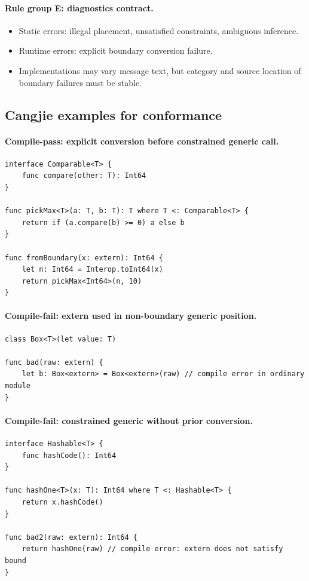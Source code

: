\documentclass[11pt,a4paper]{article}
\begin{document}
\paragraph{Rule group E: diagnostics contract.}
\begin{itemize}
  \item Static errors: illegal placement, unsatisfied constraints, ambiguous inference.
  \item Runtime errors: explicit boundary conversion failure.
  \item Implementations may vary message text, but category and source location of boundary failures must be stable.
\end{itemize}

\subsection{Cangjie examples for conformance}

\paragraph{Compile-pass: explicit conversion before constrained generic call.}
\begin{verbatim}
interface Comparable<T> {
    func compare(other: T): Int64
}

func pickMax<T>(a: T, b: T): T where T <: Comparable<T> {
    return if (a.compare(b) >= 0) a else b
}

func fromBoundary(x: extern): Int64 {
    let n: Int64 = Interop.toInt64(x)
    return pickMax<Int64>(n, 10)
}
\end{verbatim}

\paragraph{Compile-fail: extern used in non-boundary generic position.}
\begin{verbatim}
class Box<T>(let value: T)

func bad(raw: extern) {
    let b: Box<extern> = Box<extern>(raw) // compile error in ordinary module
}
\end{verbatim}

\paragraph{Compile-fail: constrained generic without prior conversion.}
\begin{verbatim}
interface Hashable<T> {
    func hashCode(): Int64
}

func hashOne<T>(x: T): Int64 where T <: Hashable<T> {
    return x.hashCode()
}

func bad2(raw: extern): Int64 {
    return hashOne(raw) // compile error: extern does not satisfy bound
}
\end{verbatim}
\end{document}
